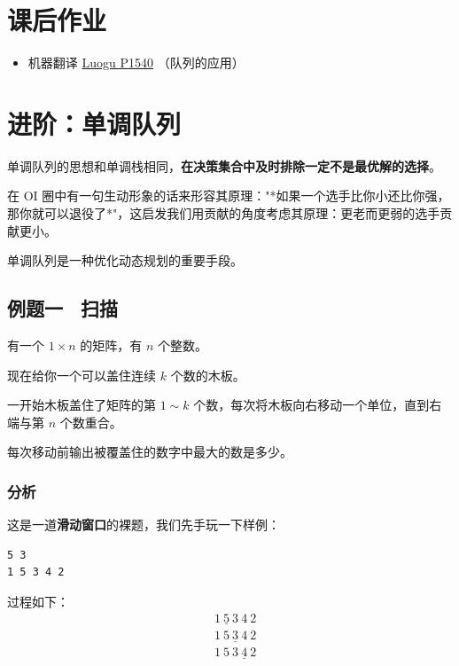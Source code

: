 \documentclass{report}
\begin{document}
\section{课后作业}

\begin{itemize}
    \item {} 机器翻译 \href{https://www.luogu.com.cn/problem/P1540}{Luogu P1540} （队列的应用）
\end{itemize}

\section{进阶：单调队列}

单调队列的思想和单调栈相同，\textbf{在决策集合中及时排除一定不是最优解的选择}。

在 OI 圈中有一句生动形象的话来形容其原理："*如果一个选手比你小还比你强，那你就可以退役了*"，这启发我们用贡献的角度考虑其原理：更老而更弱的选手贡献更小。

单调队列是一种优化动态规划的重要手段。

\subsection{例题一 \ 扫描}

有一个 $1 \times n$ 的矩阵，有 $n$ 个整数。

现在给你一个可以盖住连续 $k$ 个数的木板。

一开始木板盖住了矩阵的第 $1 \sim k$ 个数，每次将木板向右移动一个单位，直到右端与第 $n$ 个数重合。

每次移动前输出被覆盖住的数字中最大的数是多少。

\subsubsection{分析}

这是一道\textbf{滑动窗口}的裸题，我们先手玩一下样例：

\begin{verbatim}
5 3
1 5 3 4 2
\end{verbatim}

过程如下：
\[
\begin{aligned}
	& \underline{1 \ \boxed{5} \ 3} \ 4 \ 2 \\
	& 1 \ \underline{\boxed{5} \ 3 \ 4} \ 2 \\
	& 1 \ 5 \ \underline{3 \ \boxed{4} \ 2}
\end{aligned}
\]
\end{document}
